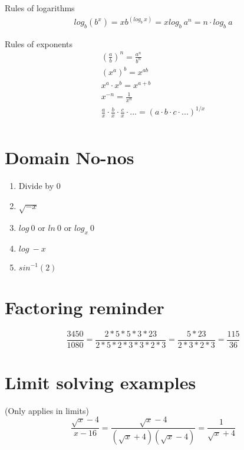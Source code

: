 \documentclass[12pt, english]{article}
\begin{document}
Rules of logarithms 
\begin{equation}
	\begin{aligned}
		log_b (b^x) = x
		b^{(log_{b}\ x)} = x
		log_{b}\ a^n = n \cdot log_b\ a
	\end{aligned}
\end{equation}

Rules of exponents 
\begin{equation}
	\begin{aligned}
		\left(\frac{a}{b}\right)^n = \frac{a^n}{b^n} \\
		(x^a)^b = x^{ab} \\
		x^a \cdot x^b = x^{a + b} \\
		x^{-n} = \frac{1}{x^n} \\
		\frac{a}{x} \cdot \frac{b}{x} \cdot \frac{c}{x} \cdot ... = (a \cdot b \cdot c \cdot ...)^{1/x} \\
	\end{aligned}
\end{equation}

\section{Domain No-nos}
\begin{enumerate}
	\item Divide by 0
	\item $\sqrt{-x}$
	\item $log\ 0$ or $ln\ 0$ or $log_x\ 0$
	\item $log\ -x$
	\item $sin^{-1}(2)$
\end{enumerate}

\section{Factoring reminder}
\begin{equation}
	\frac{3450}{1080} = \frac{2*5*5*3*23}{2*5*2*3*3*2*3} = \frac{5*23}{2*3*2*3} = \frac{115}{36}
\end{equation}

\section{Limit solving examples}
(Only applies in limits)
\begin{equation}
	\frac{\sqrt{x}-4}{x-16} = \frac{\sqrt{x}-4}{(\sqrt{x}+4)(\sqrt{x}-4)} = \frac{1}{\sqrt{x}+4}
\end{equation}
\end{document}
